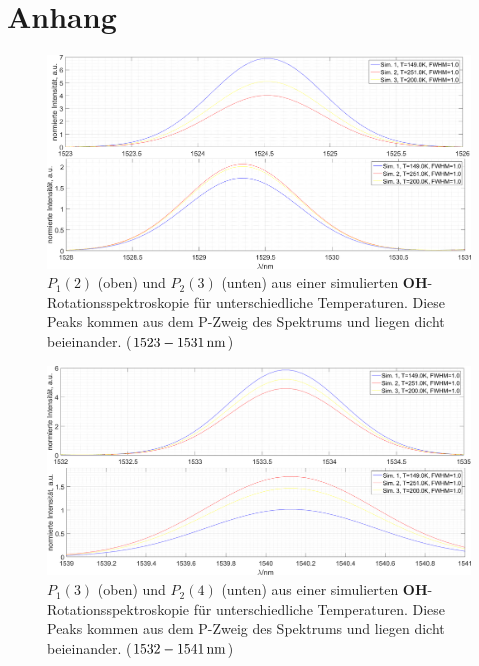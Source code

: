 \documentclass[numbers=noenddot,a4paper,notitlepage,twoside,BCOR15mm]{scrartcl}
\newcommand{\ix}[1]{_\text{#1}}
\newcommand{\fett}[1]{\textbf{#1}}
\begin{document}
	\clearpage
	\section{Anhang}\label{sec:anha}

					\begin{figure}
						\centering
						\includegraphics[width=\textwidth]{p1up2_sim_spektr.png}
						\caption{$P\ix{1}(2)$ (oben) und $P\ix{2}(3)$ (unten) aus einer simulierten \fett{OH}-Rotationsspektroskopie für unterschiedliche Temperaturen. Diese Peaks kommen aus dem P-Zweig des Spektrums und liegen dicht beieinander. ($\unit[1523-1531]{nm}$)}
						\label{img:p1up2}
					\end{figure}
					\begin{figure}
						\centering
						\includegraphics[width=\textwidth]{p3up4_sim_spektr.png}
						\caption{$P\ix{1}(3)$ (oben) und $P\ix{2}(4)$ (unten) aus einer simulierten \fett{OH}-Rotationsspektroskopie für unterschiedliche Temperaturen. Diese Peaks kommen aus dem P-Zweig des Spektrums und liegen dicht beieinander. ($\unit[1532-1541]{nm}$)}
						\label{img:p3up4}
					\end{figure}
\end{document}
